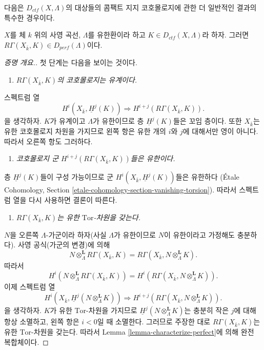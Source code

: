 \noindent
다음은 $D_{ctf}(X, \Lambda)$의 대상들의 콤팩트 지지 코호몰로지에
관한 더 일반적인 결과의 특수한 경우이다.

\begin{proposition}
\label{proposition-projective-curve-constructible-cohomology}
$X$를 체 $k$ 위의 사영 곡선, $\Lambda$를 유한환이라 하고
$K\in D_{ctf}(X, \Lambda)$라 하자. 그러면
$R\Gamma(X_{\bar k}, K)\in D_{perf}(\Lambda)$이다.
\end{proposition}

\begin{proof}[증명 개요.]
첫 단계는 다음을 보이는 것이다.
\begin{enumerate}
\item[(1)]
{\it $R\Gamma(X_{\bar k}, K)$의 코호몰로지는 유계이다.}
\end{enumerate}
스펙트럼 열
$$
H^i(X_{\bar k}, \underline H^j(K))
\Rightarrow
H^{i+j} (R\Gamma(X_{\bar k}, K)).
$$
을 생각하자. $K$가 유계이고 $\Lambda$가 유한이므로 층
$\underline H^j(K)$들은 꼬임 층이다. 또한 $X_{\bar k}$는 유한
코호몰로지 차원을 가지므로 왼쪽 항은 유한 개의 $i$와 $j$에
대해서만 영이 아니다. 따라서 오른쪽 항도 그러하다.
\begin{enumerate}
\item[(2)]
{\it 코호몰로지 군 $H^{i+j} (R\Gamma(X_{\bar k}, K))$들은 유한이다.}
\end{enumerate}
층 $\underline H^j(K)$들이 구성 가능이므로 군
$H^i(X_{\bar k}, \underline H^j(K))$들은 유한하다
(\'Etale Cohomology, Section
\ref{etale-cohomology-section-vanishing-torsion}).
따라서 스펙트럼 열을 다시 사용하면 결론이 따른다.
\begin{enumerate}
\item[(3)]
{\it $R\Gamma(X_{\bar k}, K)$는 유한 $\text{Tor}$-차원을 갖는다.}
\end{enumerate}
$N$을 오른쪽 $\Lambda$-가군이라 하자(사실 $\Lambda$가 유한이므로
$N$이 유한이라고 가정해도 충분하다). 사영 공식(가군의 변경)에 의해
$$
N \otimes^\mathbf{L}_\Lambda R \Gamma(X_{\bar k}, K) = R\Gamma(X_{\bar k},
N \otimes^\mathbf{L}_\Lambda K).
$$
따라서
$$
H^i (N \otimes^\mathbf{L}_\Lambda R\Gamma(X_{\bar k}, K)) = H^i(R\Gamma(X_{\bar
k}, N \otimes_{\Lambda}^\mathbf{L} K)).
$$
이제 스펙트럼 열
$$
H^i (X_{\bar k}, \underline H^j (N \otimes_{\Lambda}^\mathbf{L} K))
\Rightarrow
H^{i+j}(R\Gamma(X_{\bar k}, N \otimes_{\Lambda}^\mathbf{L} K)).
$$
을 생각하자. $K$가 유한 $\text{Tor}$-차원을 가지므로
$\underline H^j (N \otimes_{\Lambda}^\mathbf{L} K)$는 충분히 작은
$j$에 대해 항상 소멸하고, 왼쪽 항은 $i < 0$일 때 소멸한다.
그러므로 주장한 대로 $R\Gamma(X_{\bar k}, K)$는 유한
$\text{Tor}$-차원을 갖는다. 따라서 Lemma
\ref{lemma-characterize-perfect}에 의해 완전 복합체이다.
\end{proof}





